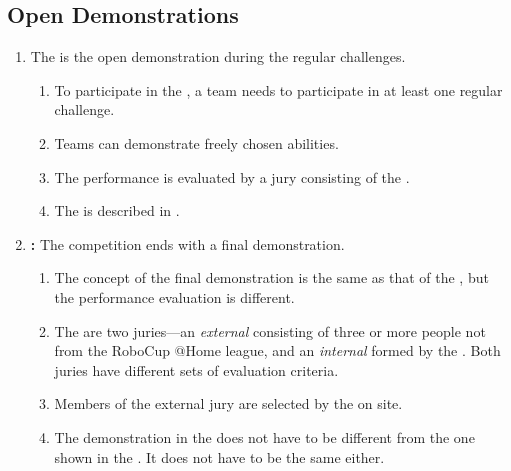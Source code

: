 \subsection{Open Demonstrations}
\label{sec:open-demonstrations}
\begin{enumerate}
	\item The  is the open demonstration during the regular challenges.
	\begin{enumerate}
		\item To participate in the , a team needs to participate in at least one regular challenge.
		\item Teams can demonstrate freely chosen abilities. 
		\item The performance is evaluated by a jury consisting of the .
		\item The  is described in .
	\end{enumerate}
	
	\item \textbf{:} The competition ends with a final demonstration.
	\begin{enumerate}
		\item The concept of the final demonstration is the same as that of the , but the performance evaluation is different. 
		\item The are two juries---an \emph{external} consisting of three or more people not from the RoboCup @Home league, and an \emph{internal} formed by the . Both juries have different sets of evaluation criteria.
		\item Members of the external jury are selected by the  on site. 
		\item The demonstration in the  does not have to be different from the one shown in the . It does not have to be the same either.
	\end{enumerate}
\end{enumerate}


